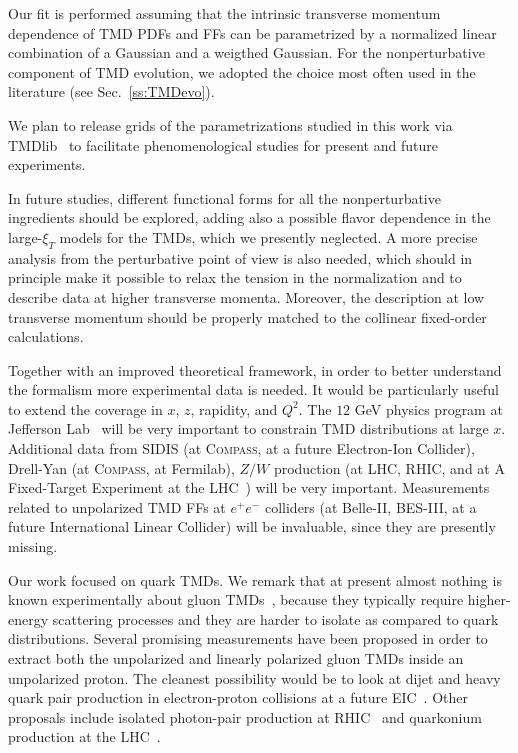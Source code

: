 \documentclass[aps,preprintnumbers,showpacs,nofootinbib,superscriptaddress,floatfix]{revtex4}
\newcommand{\compass}{\textsc{Compass}}
\newcommand{\bT}{\xi_T}
\begin{document}
Our fit is performed assuming that the intrinsic transverse momentum
dependence of TMD PDFs and FFs 
can be parametrized by a normalized linear combination of a Gaussian and a
weigthed Gaussian. 
For the nonperturbative component of TMD evolution, we adopted the choice most
often used in the literature (see Sec.~\ref{ss:TMDevo}). 

We plan to release grids of the parametrizations studied in this work via
TMDlib~\cite{Hautmann:2014kza} to facilitate phenomenological studies for
present and future experiments. 

In future studies, different
functional forms for all the nonperturbative ingredients should be explored, 
adding also a possible
flavor dependence in the large-$\bT$ models for the TMDs, which we presently neglected.
A more
precise analysis from the perturbative point of view is also needed, which
should in principle make it possible to relax the tension in the normalization and to describe data at higher transverse
momenta. Moreover, the description at low transverse momentum  
should be properly matched to 
the collinear fixed-order calculations. 

Together with an improved theoretical framework, in order to better understand
the formalism more experimental data is needed. It would be particularly
useful to extend the
coverage in $x$, $z$, rapidity, and $Q^2$.  
The $12$ GeV physics program at Jefferson Lab~\cite{Dudek:2012vr} will be very important to constrain TMD distributions at large $x$.
Additional data from SIDIS (at \compass, at a future Electron-Ion
Collider), Drell-Yan (at \compass, at Fermilab), 
$Z/W$ production (at LHC, RHIC, and at
A Fixed-Target Experiment at the LHC~\cite{Brodsky:2012vg}) 
will be very important. Measurements
related to unpolarized
TMD FFs at $e^+e^-$ colliders (at Belle-II, BES-III, at a
future International Linear Collider) will be invaluable, since they are
presently missing.

Our work focused on quark TMDs.
We remark that at present almost nothing is known experimentally about gluon
TMDs~\cite{Mulders:2000sh,Echevarria:2015uaa}, because they typically require
higher-energy scattering processes and they are harder to isolate as compared
to quark distributions. Several promising measurements have been proposed in
order to extract both the unpolarized and linearly polarized gluon TMDs inside
an unpolarized proton. The cleanest possibility would be to look at dijet and
heavy quark pair production in electron-proton collisions at a future
EIC~\cite{Boer:2010zf,Pisano:2013cya}. Other proposals include isolated
photon-pair production at RHIC~\cite{Qiu:2011ai} and quarkonium production at
the LHC~\cite{Boer:2012bt,Dunnen:2014eta,Signori:2016jwo,Lansberg:2017tlc}.   
\end{document}
